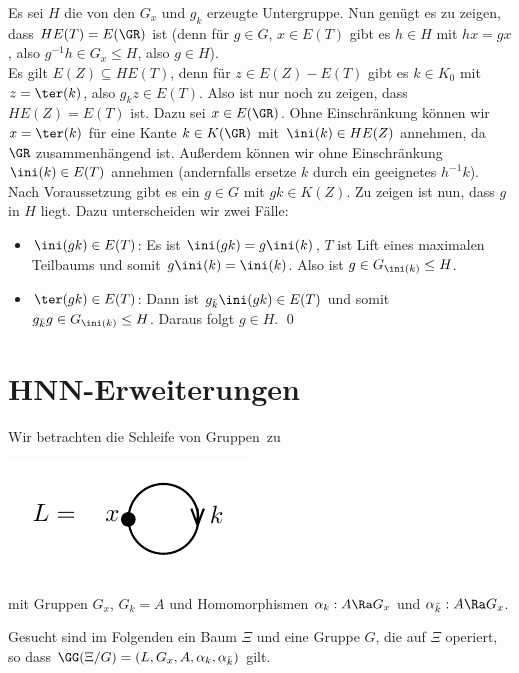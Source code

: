 \bew Es sei $H$ die von den $G_x$ und $g_k$ erzeugte Untergruppe.
Nun genügt es zu zeigen, dass $H E(T)=E(\GR)$ ist (denn für $g\in G$,
$x\in E(T)$ gibt es $h\in H$ mit $hx=gx$, also
$g^{-1}h\in G_x \leq H$, also $g\in H$).\\
Es gilt $E(Z)\subseteq H E(T)$, denn für $z\in E(Z)-E(T)$ gibt es
$k\in K_0$ mit $z=\ter(k)$, also $g_k z \in E(T)$.
Also ist nur noch zu zeigen, dass $HE(Z)=E(T)$ ist.
Dazu sei $x\in E(\GR)$. Ohne Einschränkung können wir $x=\ter(k)$
für eine Kante $k\in K(\GR)$ mit $\ini(k)\in HE(Z)$ annehmen,
da $\GR$ zusammenhängend ist. Außerdem können wir ohne Einschränkung
$\ini(k)\in E(T)$ annehmen (andernfalls ersetze $k$ durch ein
geeignetes $h^{-1}k$).
Nach Voraussetzung gibt es ein $g\in G$ mit $gk\in K(Z)$.
Zu zeigen ist nun, dass $g$ in $H$ liegt. Dazu unterscheiden wir
zwei Fälle:
\begin{itemize}
\item
$\ini(gk)\in E(T)$: Es ist $\ini(gk)=g\ini(k)$, $T$ ist Lift eines
maximalen Teilbaums und somit $g\ini(k)=\ini(k)$.
Also ist $g\in G_{\ini(k)}\leq H$.\\
\item
$\ter(gk)\in E(T)$: Dann ist $g_{\bar{k}} \ini(gk)\in E(T)$
und somit $g_{\bar{k}} g \in G_{\ini(k)}\leq H$.
Daraus folgt $g\in H$.
\qed
\end{itemize}


\section{HNN-Erweiterungen}\label{sec_hnn}

Wir betrachten die \glqq Schleife von Gruppen\grqq\ zu
\begin{center}
	\includegraphics{grugraImages/L}
\end{center}
mit Gruppen $G_x$, $G_k=A$ und Homomorphismen
$\alpha_k:A\Ra G_x$ und $\alpha_{\bar{k}}:A\Ra G_x$.

Gesucht sind im Folgenden ein Baum $\Xi$ und eine Gruppe $G$,
die auf $\Xi$ operiert, so dass
$\GG(\Xi/G) = (L,G_x,A,\alpha_k,\alpha_{\bar{k}})$ gilt.


